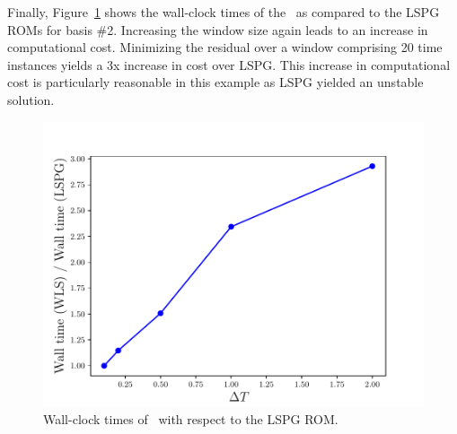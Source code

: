 Finally, Figure~\ref{fig:cav_wallclock} shows the wall-clock times of the \methodAcronymROMs\ as compared to the LSPG ROMs for basis \#2. Increasing the window size again leads to an increase in computational cost. Minimizing the residual over a window comprising 20 time instances yields a 3x increase in cost over LSPG. This increase in computational cost is particularly reasonable in this example as LSPG yielded an unstable solution. 
\begin{figure}
\begin{center}
\includegraphics[trim={0cm 0cm 0cm 0cm},clip,width=0.49\linewidth]{figs/cavity/walltime_vs_window_compare.pdf}
\caption{Wall-clock times of \methodAcronymROMs\ with respect to the LSPG ROM.}
\label{fig:cav_wallclock}
\end{center}
\end{figure}



